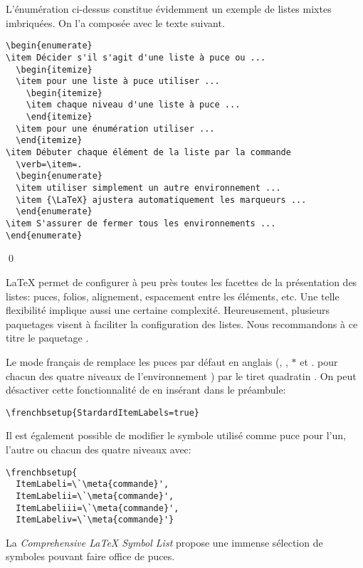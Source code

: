 \begin{exemple}
  L'énumération ci-dessus constitue évidemment un exemple de listes
  mixtes imbriquées. On l'a composée avec le texte suivant.
  \begin{demo}
\begin{lstlisting}
\begin{enumerate}
\item Décider s'il s'agit d'une liste à puce ou ...
  \begin{itemize}
  \item pour une liste à puce utiliser ...
    \begin{itemize}
    \item chaque niveau d'une liste à puce ...
    \end{itemize}
  \item pour une énumération utiliser ...
  \end{itemize}
\item Débuter chaque élément de la liste par la commande
  \verb=\item=.
  \begin{enumerate}
  \item utiliser simplement un autre environnement ...
  \item {\LaTeX} ajustera automatiquement les marqueurs ...
  \end{enumerate}
\item S'assurer de fermer tous les environnements ...
\end{enumerate}
\end{lstlisting}
  \end{demo}
  \qed
\end{exemple}

{\LaTeX} permet de configurer à peu près toutes les facettes de la
présentation des listes: puces, folios, alignement, espacement entre
les éléments, etc. Une telle flexibilité implique aussi une certaine
complexité. Heureusement, plusieurs paquetages visent à faciliter la
configuration des listes. Nous recommandons à ce titre le paquetage
 \citep{enumitem}.

\begin{conseil}
  Le mode français de  remplace les puces par défaut en
  anglais ({\textbullet}, {\textendash}, $\ast$ et $.$ pour chacun
  des quatre niveaux de l'environnement ) par le tiret
  quadratin {\textemdash}. On peut désactiver cette fonctionnalité de
   en insérant dans le préambule:
\begin{lstlisting}
\frenchbsetup{StardardItemLabels=true}
\end{lstlisting}
  Il est également possible de modifier le symbole utilisé comme
  puce pour l'un, l'autre ou chacun des quatre niveaux avec:
\begin{lstlisting}
\frenchbsetup{
  ItemLabeli=\`\meta{commande}',
  ItemLabelii=\`\meta{commande}',
  ItemLabeliii=\`\meta{commande}',
  ItemLabeliv=\`\meta{commande}'}
\end{lstlisting}
  La \emph{Comprehensive {\LaTeX} Symbol List} \citep{comprehensive}
  propose une immense sélection de symboles pouvant faire office de
  puces.
\end{conseil}



